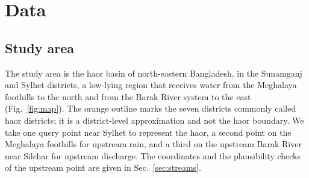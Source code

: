 \section{Data}
\subsection{Study area}\label{sec:area}
The study area is the haor basin of north-eastern Bangladesh, in the Sunamganj and Sylhet districts, a low-lying region that receives water from the Meghalaya foothills to the north and from the Barak River system to the east (Fig.~\ref{fig:map}). The orange outline marks the seven districts commonly called haor districts; it is a district-level approximation and not the haor boundary. We take one query point near Sylhet to represent the haor, a second point on the Meghalaya foothills for upstream rain, and a third on the upstream Barak River near Silchar for upstream discharge. The coordinates and the plausibility checks of the upstream point are given in Sec.~\ref{sec:streams}.

